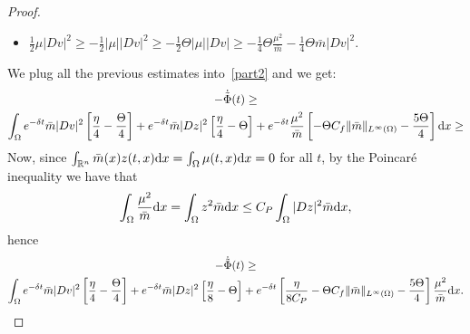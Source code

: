 \documentclass[10pt,a4paper,nouppercase,nowrite]{article}
\numberwithin{equation}{section}
\newcommand{\di}{{\rm d}}
\newcommand{\R}{\mathbb{R}}
\theoremstyle{definition}
\begin{document}
\begin{proof}
\begin{itemize}
			\item $\frac{1}{2} \mu |Dv|^2 \geq -\frac{1}{2} |\mu| |Dv|^2 \geq - \frac{1}{2} \Theta |\mu| |Dv| \geq - \frac{1}{4} \Theta \frac{\mu^2}{\bar{m}} - \frac{1}{4} \Theta \bar{m} |Dv|^2.$
		\end{itemize}
		We plug all the previous estimates into~\eqref{part2} and we get:
		\begin{multline*}
			-\dot{\tilde{\Phi}}(t) \geq \\
			\int_{\Omega} e^{-\delta t} \bar{m} |Dv|^2 \left[ \frac{\eta}{4} - \frac{\Theta}{4} \right] + e^{-\delta t} \bar{m} |Dz|^2 \left[ \frac{\eta}{4} - \Theta \right]+ e^{-\delta t} \frac{\mu^2}{\bar{m}}  \left[ - \Theta C_f \|\bar{m}\|_{L^{\infty}(\Omega)} - \frac{5 \Theta}{4} \right] \di x \geq
		\end{multline*}
		Now, since $\int_{\R^n} \bar{m}(x) z(t,x) \di x = \int_{\Omega} \mu(t,x) \di x = 0$ for all $t$, by the Poincar\'e inequality we have that
		\[
		 \int_{\Omega} \frac{\mu^2}{\bar{m}} \di x = \int_{\Omega} z^2 \bar{m} \di x \le C_P \int_{\Omega} |Dz|^2 \bar{m} \di x,
		\]
		hence
		\begin{multline*}
			-\dot{\tilde{\Phi}}(t) \geq \\
			\int_{\Omega} e^{-\delta t} \bar{m} |Dv|^2 \left[ \frac{\eta}{4} - \frac{\Theta}{4} \right] + e^{-\delta t} \bar{m} |Dz|^2 \left[ \frac{\eta}{8} - \Theta \right] + e^{-\delta t} \left[\frac{\eta}{8C_P}- \Theta C_f \|\bar{m}\|_{L^{\infty}(\Omega)} -\frac{5\Theta}{4} \right] \frac{\mu^2}{\bar{m}} \di x.
		\end{multline*}
		

\end{proof}
\end{document}
